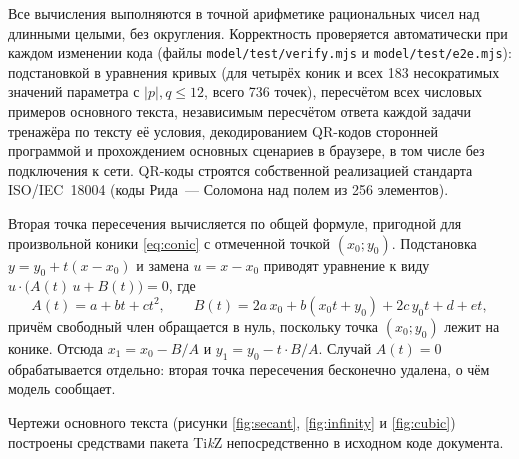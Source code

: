 \documentclass[a4paper,14pt]{extreport}
\theoremstyle{definition}
\begin{document}
Все вычисления выполняются в точной арифметике рациональных чисел над
длинными целыми, без округления. Корректность проверяется автоматически при
каждом изменении кода (файлы \texttt{model/test/verify.mjs} и
\texttt{model/test/e2e.mjs}): подстановкой в уравнения кривых (для четырёх коник
и всех 183 несократимых значений параметра с $|p|,q\leqslant12$, всего 736
точек), пересчётом всех числовых примеров основного текста, независимым
пересчётом ответа каждой задачи тренажёра по тексту её условия, декодированием
QR-кодов сторонней программой и прохождением основных сценариев в браузере, в
том числе без подключения к сети. QR-коды строятся собственной реализацией
стандарта ISO/IEC~18004 (коды Рида~--- Соломона над полем из 256 элементов).

Вторая точка пересечения вычисляется по общей формуле, пригодной для
произвольной коники \eqref{eq:conic} с отмеченной точкой $(x_0;y_0)$. Подстановка
$y=y_0+t(x-x_0)$ и замена $u=x-x_0$ приводят уравнение к виду
$u\cdot\bigl(A(t)\,u+B(t)\bigr)=0$, где
\[
  A(t)=a+bt+ct^2,\qquad
  B(t)=2a\,x_0+b(x_0t+y_0)+2c\,y_0t+d+et,
\]
причём свободный член обращается в нуль, поскольку точка $(x_0;y_0)$ лежит на
конике. Отсюда $x_1=x_0-B/A$ и $y_1=y_0-t\cdot B/A$. Случай $A(t)=0$
обрабатывается отдельно: вторая точка пересечения бесконечно удалена, о чём
модель сообщает.

Чертежи основного текста (рисунки \ref{fig:secant}, \ref{fig:infinity} и
\ref{fig:cubic}) построены средствами пакета Ti\emph{k}Z непосредственно в
исходном коде документа.
\end{document}
